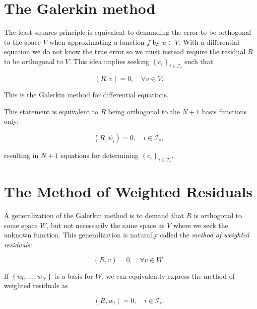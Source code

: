 \documentclass[../main.tex]{subfiles}
\begin{document}
	\section[The Galerkin method]{The Galerkin method} 
	\label{sec:sec_11_5}
	
	\noindent The least-squares principle is equivalent to demanding the error to be orthogonal to the space $V$ when approximating a function $f$ by $u \in V$. With a differential equation we do not know the true error so we must instead require the residual $R$ to be orthogonal to $V$. This idea implies seeking $\left\{c_{i}\right\}_{i \in \mathcal{I}_{s}}$ such that
	
	\begin{equation}
		\label{eqa138}
		(R, v)=0, \quad \forall v \in V .
	\end{equation}

	\noindent This is the Galerkin method for differential equations.
	
	This statement is equivalent to $R$ being orthogonal to the $N+1$ basis functions only:

	\begin{equation}
		\label{eqa139}
		\left(R, \psi_{i}\right)=0, \quad i \in \mathcal{I}_{s},
	\end{equation}

	resulting in $N+1$ equations for determining $\left\{c_{i}\right\}_{i \in \mathcal{I}_{s}}$.

\section[Basic principles for approximating differential equations]{The Method of Weighted Residuals}
	\label{sec:sec_11_6} 
	\noindent A generalization of the Galerkin method is to demand that $R$ is orthogonal to some space $W$, but not necessarily the same space as $V$ where we seek the unknown function. This generalization is naturally called the \emph{method of weighted residuals}:

	\begin{equation}
		\label{eqa140}
		(R, v)=0, \quad \forall v \in W .
	\end{equation}
	
	\noindent If $\left\{w_{0}, \ldots, w_{N}\right\}$ is a basis for $W$, we can equivalently express the method of weighted residuals as
	
	\begin{equation}
		\label{eqa141}
		\left(R, w_{i}\right)=0, \quad i \in \mathcal{I}_{s} .
	\end{equation}
\end{document}

